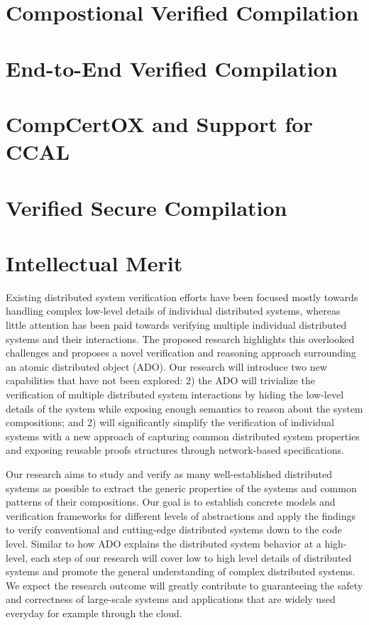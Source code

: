 \documentclass[11pt]{article}
\begin{document}
\section{Compostional Verified Compilation}

\section{End-to-End Verified Compilation}

\section{CompCertOX and Support for CCAL}
    
\section{Verified Secure Compilation}


\section{Intellectual Merit}

Existing distributed system verification efforts have been focused
mostly towards handling complex low-level details of individual
distributed systems, whereas little attention has been paid towards
verifying multiple individual distributed systems and their
interactions. The proposed research highlights this overlooked
challenges and proposes a novel verification and reasoning approach
surrounding an atomic distributed object (ADO).  Our research will
introduce two new capabilities that have not been explored: 2) the ADO
will trivialize the verification of multiple distributed system
interactions by hiding the low-level details of the system while
exposing enough semantics to reason about the system compositions; and
2) \sysname{} will significantly simplify the verification of
individual systems with a new approach of capturing common distributed
system properties and exposing reusable proofs structures through
network-based specifications.

Our research aims to study and verify as many well-established
distributed systems as possible to extract the generic properties of
the systems and common patterns of their compositions. Our goal is to
establish concrete models and verification frameworks for different
levels of abstractions and apply the findings to verify conventional
and cutting-edge distributed systems down to the code level. Similar
to how ADO explains the distributed system behavior at a high-level,
each step of our research will cover low to high level details of
distributed systems and promote the general understanding of complex
distributed systems. We expect the research outcome will greatly
contribute to guaranteeing the safety and correctness of large-scale
systems and applications that are widely used everyday for example
through the cloud.
\end{document}
